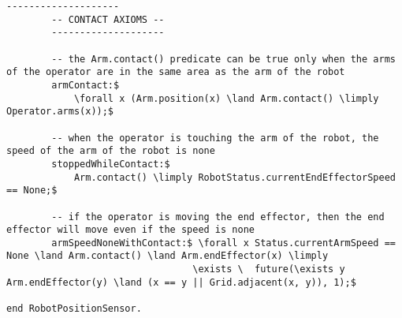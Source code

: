 \begin{lstlisting}[fontadjust, mathescape, frame=tlb]
        --------------------
        -- CONTACT AXIOMS --
        --------------------

        -- the Arm.contact() predicate can be true only when the arms of the operator are in the same area as the arm of the robot
        armContact:$
            \forall x (Arm.position(x) \land Arm.contact() \limply Operator.arms(x));$

        -- when the operator is touching the arm of the robot, the speed of the arm of the robot is none
        stoppedWhileContact:$
            Arm.contact() \limply RobotStatus.currentEndEffectorSpeed == None;$

        -- if the operator is moving the end effector, then the end effector will move even if the speed is none
        armSpeedNoneWithContact:$ \forall x Status.currentArmSpeed == None \land Arm.contact() \land Arm.endEffector(x) \limply
                                 \exists \  future(\exists y Arm.endEffector(y) \land (x == y || Grid.adjacent(x, y)), 1);$
        
end RobotPositionSensor.\end{lstlisting}